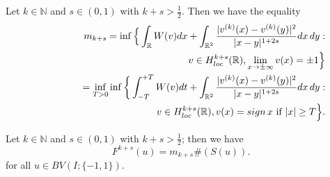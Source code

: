 \documentclass[10pt,a4paper]{amsart}
\begin{document}
\begin{proposition}\label{sut}
Let $k\in \mathbb N$ and $s\in (0,1)$ with $k+s>\frac12$. Then we have the equality
\begin{eqnarray}\label{emme}\nonumber
&&m_{k+s} =\inf\Big\{\int_{\mathbb R} W(v)dx+\int_{\mathbb R^2}\frac{|v^{(k)}(x)-v^{(k)}(y)|^2}{|x-y|^{1+2s}} dx\,dy :\\
&& \hskip4.5cm v\in H^{k+s}_{\rm loc}(\mathbb R), \lim_{x\to\pm\infty}v(x)=\pm1\Big\}\\
\label{emmetilde}\nonumber
&&\hskip1cm =\inf_{T>0} \inf\bigg\{\int_{-T}^{+T} W(v)dt +\int_{\mathbb R^2}\frac{|v^{(k)}(x)-v^{(k)}(y)|^2}{|x-y|^{1+2s}} dx\,dy :\\
&& \hskip4cm v\in H^{k+s}_{\rm loc}(\mathbb R), v(x)={\rm sign}\, x\hbox{ \rm if }|x| \ge T\Big\}.
\end{eqnarray}
\end{proposition}

\begin{theorem} Let $k\in \mathbb N$ and $s\in (0,1)$ with $k+s>\frac12$; then
we have 
 \begin{equation}\label{k+s-lim-1}
F^{k+s}(u)= m_{k+s} \#(S(u)).
\end{equation}
for all $u\in BV(I;\{-1,1\})$.
\end{theorem}
\end{document}
